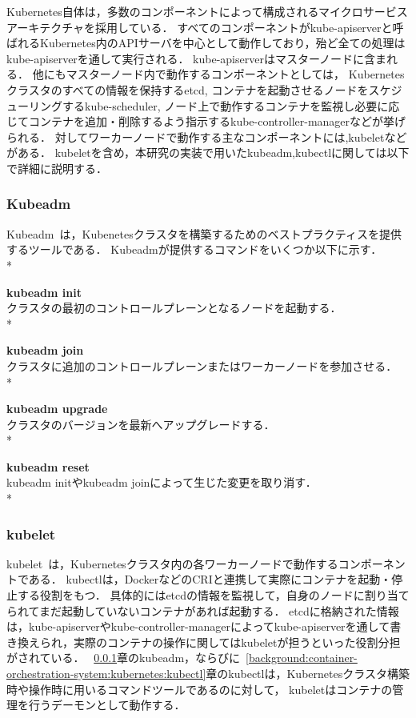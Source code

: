 Kubernetes自体は，多数のコンポーネントによって構成されるマイクロサービスアーキテクチャを採用している．
すべてのコンポーネントがkube-apiserverと呼ばれるKubernetes内のAPIサーバを中心として動作しており，殆ど全ての処理はkube-apiserverを通して実行される．
kube-apiserverはマスターノードに含まれる．
他にもマスターノード内で動作するコンポーネントとしては，
Kubernetesクラスタのすべての情報を保持するetcd,
コンテナを起動させるノードをスケジューリングするkube-scheduler,
ノード上で動作するコンテナを監視し必要に応じてコンテナを追加・削除するよう指示するkube-controller-managerなどが挙げられる．
対してワーカーノードで動作する主なコンポーネントには,kubeletなどがある．
kubeletを含め，本研究の実装で用いたkubeadm,kubectlに関しては以下で詳細に説明する．

\subsubsection{Kubeadm}
\label{background:container-orchestration-system:kubernetes:kubeadm}

Kubeadm~\cite{Kubeadm}は，Kubenetesクラスタを構築するためのベストプラクティスを提供するツールである．
Kubeadmが提供するコマンドをいくつか以下に示す．\\*

{\bf kubeadm init}\\
クラスタの最初のコントロールプレーンとなるノードを起動する．\\*

{\bf kubeadm join}\\
クラスタに追加のコントロールプレーンまたはワーカーノードを参加させる．\\*

{\bf kubeadm upgrade}\\
クラスタのバージョンを最新へアップグレードする．\\*

{\bf kubeadm reset}\\
kubeadm initやkubeadm joinによって生じた変更を取り消す．\\*

\subsubsection{kubelet}
\label{background:container-orchestration-system:kubernetes:kubelet}

kubelet~\cite{kubelet}は，Kubernetesクラスタ内の各ワーカーノードで動作するコンポーネントである．
kubectlは，DockerなどのCRIと連携して実際にコンテナを起動・停止する役割をもつ．
具体的にはetcdの情報を監視して，自身のノードに割り当てられてまだ起動していないコンテナがあれば起動する．
etcdに格納された情報は，kube-apiserverやkube-controller-managerによってkube-apiserverを通して書き換えられ，実際のコンテナの操作に関してはkubeletが担うといった役割分担がされている．
~\ref{background:container-orchestration-system:kubernetes:kubeadm}章のkubeadm，ならびに~\ref{background:container-orchestration-system:kubernetes:kubectl}章のkubectlは，Kubernetesクラスタ構築時や操作時に用いるコマンドツールであるのに対して，
kubeletはコンテナの管理を行うデーモンとして動作する．

